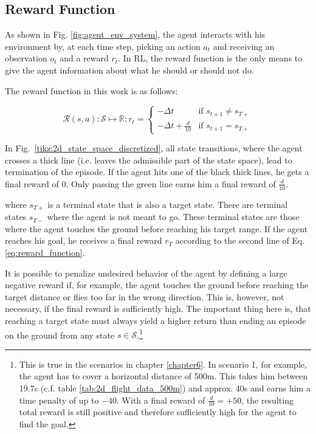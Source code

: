 \subsection{Reward Function}
\label{sec:reward-function}

As shown in Fig. \ref{fig:agent_env_system}, the agent interacts with his environment by, at each time step, picking an action $a_t$ and receiving an observation $o_t$ and a reward $r_t$. In RL, the reward function is the only means to give the agent information about what he should or should not do.

The reward function in this work is as follows:

\begin{equation}
\mathcal{R}(s,a): \mathcal{S} \mapsto \mathbb{R}: r_t =
\begin{cases}
-\Delta t & \text{if } s_{t+1} \neq s_{T+}\\
-\Delta t + \frac{d}{10} & \text{if } s_{t+1} = s_{T+}
\end{cases}
\label{eq:reward_function}
\end{equation}

In Fig.~\ref{tikz:2d_state_space_discretized}, all state transitions, where the agent crosses a thick line (i.e. leaves the admissible part of the state space), lead to termination of the episode. If the agent hits one of the black thick lines, he gets a final reward of $0$. Only passing the green line earns him a final reward of $\frac{d}{10}$.

where $s_{T+}$ is a terminal state that is also a target state. There are terminal states $s_{T-}$ where the agent is not meant to go. These terminal states are those where the agent touches the ground before reaching his target range. If the agent reaches his goal, he receives a final reward $r_T$ according to the second line of Eq. \ref{eq:reward_function}. 

It is possible to penalize undesired behavior of the agent by defining a large negative reward if, for example, the agent touches the ground before reaching the target distance or flies too far in the wrong direction. This is, however, not necessary, if the final reward is sufficiently high. The important thing here is, that reaching a target state must always yield a higher return than ending an episode on the ground from any state $s \in \mathcal{S}$.\footnote{This is true in the scenarios in chapter \ref{chapter6}. In scenario 1, for example, the agent has to cover a horizontal distance of 500m. This takes him between 19.7s (c.f. table \ref{tab:2d_flight_data_500m}) and approx. 40s and earns him a time penalty of up to $-40$. With a final reward of $\frac{d}{10}=+50$, the resulting total reward is still positive and therefore sufficiently high for the agent to find the goal.}

